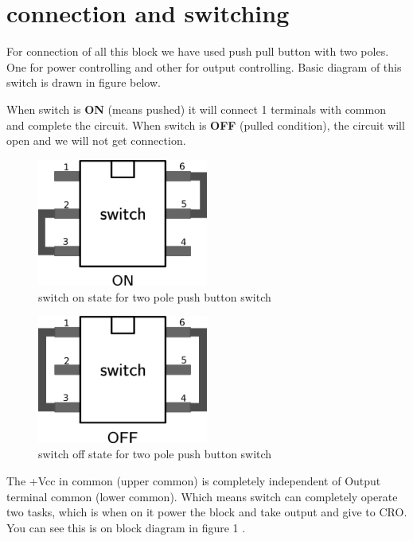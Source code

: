 \documentclass[14pt,a4paper]{extarticle}
\begin{document}
\section{connection and switching}
\label{sec:org21b1e01}

For connection of all this block we have used push pull button with two poles. One for power controlling and other for output controlling. Basic diagram of this switch is drawn in figure below.

When switch is \textbf{\textbf{ON}} (means pushed) it will connect 1 terminals with common and complete the circuit. When switch is \textbf{\textbf{OFF}} (pulled condition), the circuit will open and we will not get connection.

\begin{figure}[H]
    \centering
    \label{switchon}
    \includegraphics[width=0.5\textwidth]{imgs/switchon.png}
    \caption{switch on state for two pole push button switch}
\end{figure}

\begin{figure}[H]
    \centering
    \label{switchoff}
    \includegraphics[width=0.5\textwidth]{imgs/switchoff.png}
    \caption{switch off state for two pole push button switch}
\end{figure}

The +Vcc in common (upper common) is completely independent of Output terminal common (lower common). Which means switch can completely operate two tasks, which is when on it power the block and take output and give to CRO. You can see this is on block diagram in figure 1 \label{orgb1d7515}.
\end{document}
